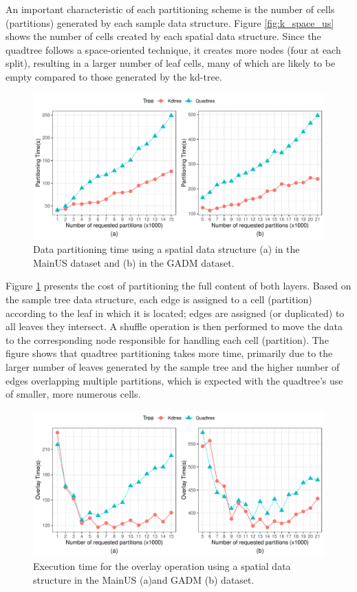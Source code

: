  An important characteristic of each partitioning scheme is the number of cells (partitions) generated by each sample data structure. Figure \ref{fig:k_space_us} shows the number of cells created by each spatial data structure. Since the quadtree follows a space-oriented technique, it creates more nodes (four at each split), resulting in a larger number of leaf cells, many of which are likely to be empty compared to those generated by the kd-tree.

 \begin{figure}
    \centering
    \includegraphics[width=\textwidth]{chapterExtension/K/K_Partitioning} 
    \caption{Data partitioning time using a spatial data structure (a) in the MainUS dataset and (b) in the GADM dataset.} \label{fig:k_partitioning_us}
 \end{figure}

 Figure \ref{fig:k_partitioning_us} presents the cost of partitioning the full content of both layers. Based on the sample tree data structure, each edge is assigned to a cell (partition) according to the leaf in which it is located; edges are assigned (or duplicated) to all leaves they intersect. A shuffle operation is then performed to move the data to the corresponding node responsible for handling each cell (partition). The figure shows that quadtree partitioning takes more time, primarily due to the larger number of leaves generated by the sample tree and the higher number of edges overlapping multiple partitions, which is expected with the quadtree’s use of smaller, more numerous cells.

\begin{figure}
    \centering
    \includegraphics[width=\textwidth]{chapterExtension/K/K_Overlay} 
    \caption{Execution time for the overlay operation using a spatial data structure in the MainUS (a)and GADM (b) dataset.} \label{fig:k_overlay_us}
\end{figure}

